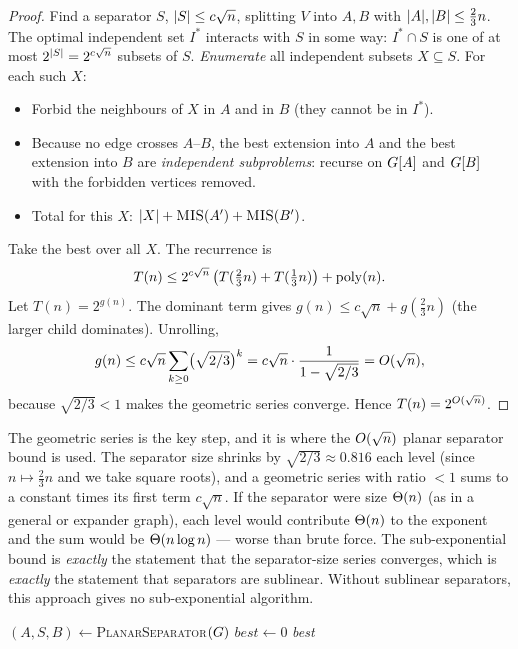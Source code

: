 \begin{proof}
Find a separator $S$, $\lvert S\rvert\le c\sqrt n$, splitting $V$ into $A,B$ with $\lvert A\rvert,\lvert B\rvert\le\tfrac23 n$. The optimal independent set $I^*$ interacts with $S$ in some way: $I^*\cap S$ is one of at most $2^{\lvert S\rvert}=2^{c\sqrt n}$ subsets of $S$. \emph{Enumerate} all independent subsets $X\subseteq S$. For each such $X$:
\begin{itemize}
  \item Forbid the neighbours of $X$ in $A$ and in $B$ (they cannot be in $I^*$).
  \item Because no edge crosses $A$--$B$, the best extension into $A$ and the best extension into $B$ are \emph{independent subproblems}: recurse on $G[A]$ and $G[B]$ with the forbidden vertices removed.
  \item Total for this $X$: $\lvert X\rvert + \textsc{MIS}(A') + \textsc{MIS}(B')$.
\end{itemize}
Take the best over all $X$. The recurrence is
\[
  T(n)\le 2^{c\sqrt n}\,\big(T(\tfrac23 n)+T(\tfrac13 n)\big)+\operatorname{poly}(n).
\]
Let $T(n)=2^{g(n)}$. The dominant term gives $g(n)\le c\sqrt n + g(\tfrac23 n)$ (the larger child dominates). Unrolling,
\[
  g(n) \le c\sqrt n\sum_{k\ge0}\bigl(\sqrt{2/3}\bigr)^{k} = c\sqrt n\cdot\frac{1}{1-\sqrt{2/3}} = O(\sqrt n),
\]
because $\sqrt{2/3}<1$ makes the geometric series converge. Hence $T(n)=2^{O(\sqrt n)}$.
\end{proof}

\begin{whybox}
The geometric series is the key step, and it is where the $O(\sqrt n)$ planar separator bound is used. The separator size shrinks by $\sqrt{2/3}\approx 0.816$ each level (since $n\mapsto\tfrac23 n$ and we take square roots), and a geometric series with ratio $<1$ sums to a constant times its first term $c\sqrt n$. If the separator were size $\Theta(n)$ (as in a general or expander graph), each level would contribute $\Theta(n)$ to the exponent and the sum would be $\Theta(n\log n)$ --- worse than brute force. The sub-exponential bound is \emph{exactly} the statement that the separator-size series converges, which is \emph{exactly} the statement that separators are sublinear. Without sublinear separators, this approach gives no sub-exponential algorithm.
\end{whybox}

\begin{algorithm}[H]
\caption{\textsc{PlanarMIS}$(\Gph)$ --- sub-exponential max independent set}
\label{ch27:alg-mis}
\DontPrintSemicolon
{}
$(A,S,B)\gets$\textsc{PlanarSeparator}$(\Gph)$\;
$\textit{best}\gets 0$\;
\Return \textit{best}\;
\end{algorithm}

